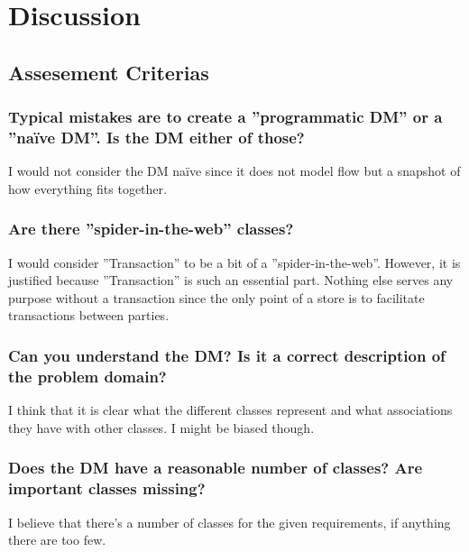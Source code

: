 \documentclass[a4paper]{scrreprt}
\begin{document}
\chapter{Discussion}


    \section{Assesement Criterias}
        \subsection{Typical mistakes are to create a ''programmatic DM'' or a ''naïve DM''. Is the DM either of those?}
            I would not consider the DM naïve since it does not model flow but a
            snapshot of how everything fits together.

        \subsection{Are there ''spider-in-the-web'' classes?}
            I would consider ''Transaction'' to be a bit of a ''spider-in-the-web''.
            However, it is justified because ''Transaction'' is such an essential
            part. Nothing else serves any purpose without a transaction since the
            only point of a store is to facilitate transactions between parties.
            
        \subsection{Can you understand the DM? Is it a correct description of the problem domain?}
            I think that it is clear what the different classes represent and what
            associations they have with other classes. I might be biased though.

        \subsection{Does the DM have a reasonable number of classes? Are important classes missing?}
            I believe that there's a  number of classes for the given
            requirements, if anything there are too few.
\end{document}
